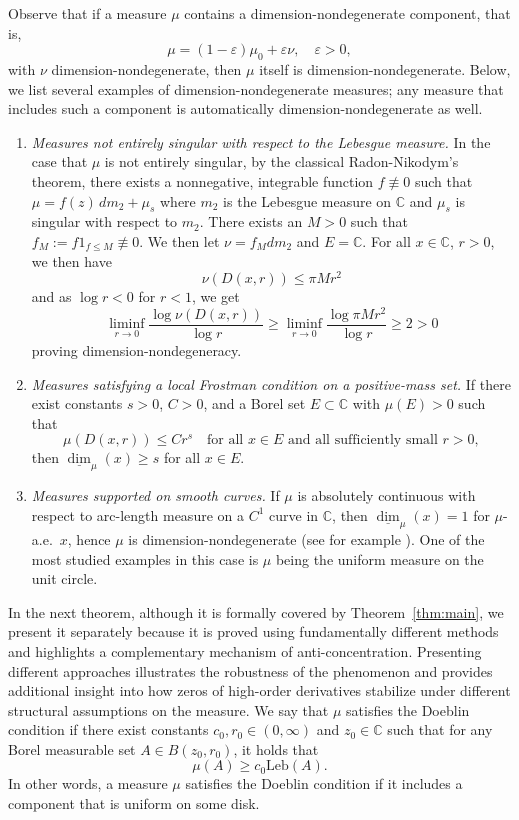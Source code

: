 \documentclass[12pt, reqno]{amsart}
\theoremstyle{plain}
\theoremstyle{definition}
\newcommand\C{{\mathbb{C}}}
\begin{document}
 Observe that if a measure $\mu$ contains a dimension-nondegenerate component, that is,
 \[
 \mu = (1-\varepsilon)\mu_0 + \varepsilon \nu, \quad \varepsilon>0,
 \]
 with $\nu$ dimension-nondegenerate, then $\mu$ itself is dimension-nondegenerate. Below, we list several examples of dimension-nondegenerate measures; any measure that includes such a component is automatically dimension-nondegenerate as well.
 
 \begin{enumerate}
   
 	\item \emph{Measures not entirely singular with respect to the Lebesgue measure.}
 	In the case that $\mu$ is not entirely singular, by the classical Radon-Nikodym's theorem, there exists a nonnegative, integrable function $f\not\equiv 0$ such that $\mu = f(z)\,dm_2 + \mu_s$ where $m_2$ is the Lebesgue measure on $\C$ and $\mu_s$ is singular with respect to $m_2$. There exists an $M>0$ such that $f_M:= f \text{1}_{f\le M} \not\equiv 0$. We then let $\nu = f_M dm_2$ and $E=\C$. For all $x\in \C$, $r>0$, we then have 
 	$$\nu(D(x, r))\le \pi M r^{2}$$
 	and as $\log r<0$ for $r<1$, we get
 	$$ \liminf_{r\to 0}\frac{\log \nu(D(x,r))}{\log r} \ge  \liminf_{r\to 0} \frac{\log \pi M r^{2}}{\log r}\ge 2>0$$
 	proving dimension-nondegeneracy.
 	
 	\item \emph{Measures satisfying a local Frostman condition on a positive-mass set.}
 	If there exist constants $s>0$, $C>0$, and a Borel set $E\subset\C$
 	with $\mu(E)>0$ such that
 	\[
 	\mu(D(x,r)) \le C r^{s}
 	\quad \text{for all } x\in E \text{ and all sufficiently small } r>0,
 	\]
 	then $\underline{\dim}_{\mu}(x)\ge s$ for all $x\in E$.
 	
 	
 	\item \emph{Measures supported on smooth curves.}
 	If $\mu$ is absolutely continuous with respect to arc-length measure
 	on a $C^1$ curve in $\C$, then $\underline{\dim}_{\mu}(x)=1$ for
 	$\mu$-a.e.\ $x$, hence $\mu$ is dimension-nondegenerate (see for example \cite{mattila1999geometry}). One of the most studied examples in this case is $\mu$ being the uniform measure on the unit circle.
 \end{enumerate}
  
 
 
 
  In the next theorem, although it is formally covered by
  Theorem~\ref{thm:main}, we present it separately because it is
  proved using fundamentally different methods and highlights a
  complementary mechanism of anti-concentration. Presenting different approaches illustrates the robustness of
  the phenomenon and provides additional insight into how zeros of
  high-order derivatives stabilize under different structural assumptions
  on the measure. We say that $\mu$ satisfies the Doeblin condition if there exist constants $c_0, r_0\in (0, \infty)$ and $z_0\in \C$ such that for any Borel measurable set $A\in B(z_0, r_0)$, it holds that
 \begin{equation}
 	\mu(A)\ge c_0 \text{Leb}(A).\label{cond:doeblin}
 \end{equation}
 In other words, a measure $\mu$ satisfies the Doeblin condition if it includes a component that is uniform on some disk.
 
\end{document}
